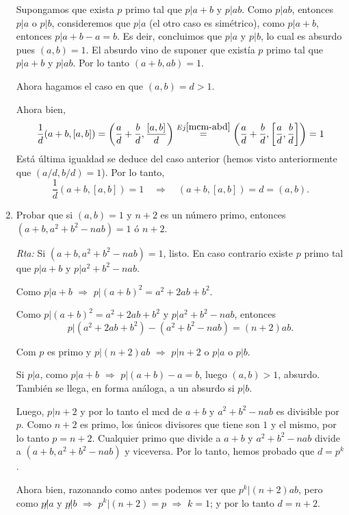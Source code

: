 \documentclass[a4paper,12pt,twoside,spanish,reqno]{amsbook}
\numberwithin{equation}{section}
\newcommand{\rta}{\noindent\textit{Rta: }}
\begin{document}
\begin{enumerate}
Supongamos que exista $p$ primo  tal que $p| a+b$ y $p| ab$. Como $p|ab$,  entonces $p|a$ o $p|b$, consideremos que $p|a$ (el otro caso es simétrico),  como $p|a+b$, entonces $p| a+b-a=b$. Es deir,  concluimos que $p|a$ y $p|b$, lo cual es absurdo pues $(a,b)= 1$. El absurdo vino de suponer que existía $p$ primo tal que  $p| a+b$ y $p| ab$. Por lo tanto $(a+b,ab) =1$.

Ahora hagamos el caso en  que  $(a,b)=d > 1$. 

Ahora bien,
\begin{equation*}
    \frac{1}{d}(a+b,[a,b]) = \left(\frac{a}{d}+\frac{b}{d},\frac{[a,b]}{d}\right)  \stackrel{Ej \ref{mcm-abd}}{=}
    \left(\frac{a}{d}+\frac{b}{d},\left[\dfrac{a}{d},\dfrac{b}{d}\right]\right)  =1
\end{equation*}   
Está última igualdad se deduce del caso anterior (hemos visto anteriormente  que $(a/d, b/d)=1$). Por lo tanto,
\begin{equation*}
    \frac{1}{d}(a+b,[a,b]) = 1 \quad \Rightarrow \quad (a+b,[a,b]) = d = (a,b).
\end{equation*}  

\item Probar que si $(a,b)=1$ y $n+2$ es un número primo, entonces $(a+b, a^2 + b^2 - nab) = 1$ ó $n+2$.

\rta Si  $(a+b, a^2 + b^2 - nab) = 1$, listo. En  caso contrario  existe $p$ primo tal que $p|a+b$ y $p| a^2 + b^2 - nab$. 

Como $p|a+b$ $\Rightarrow$ $p|(a+b)^2 = a^2 +2ab +b^2$.

Como $p|(a+b)^2 = a^2 +2ab +b^2$ y  $p| a^2 + b^2 - nab$, entonces  
$$p| ( a^2 +2ab +b^2) - (a^2 + b^2 - nab)= (n+2)ab.$$

Com $p$ es primo y $p|(n+2)ab$ $\Rightarrow$ $p|n+2$ o $p|a$ o $p|b$.

Si $p|a$, como $p|a+b$ $\Rightarrow$ $p | (a+b) -a= b$, luego $(a,b) > 1$,  absurdo. También se llega,  en forma análoga, a un absurdo si $p|b$. 

Luego, $p|n+2$ y por  lo tanto el mcd de $a+b$ y $a^2 + b^2 - nab$ es divisible por $p$. Como $n+2$  es primo, los únicos divisores que tiene son $1$ y el mismo, por lo tanto $p=n+2$.  Cualquier primo que divide a $a+b$ y $a^2 + b^2 - nab$ divide  a $(a+b, a^2 + b^2 - nab)$ y  viceversa. Por lo tanto, hemos probado que $d=p^k$. 

Ahora bien,  razonando como antes podemos ver que $p^k| (n+2)ab$, pero como $p\not|a$ y $p\not|b$ $\Rightarrow$  $p^k| (n+2) = p$ $\Rightarrow$ $k=1$; y por lo tanto $d= n+2$. 



\end{enumerate}
\end{document}
